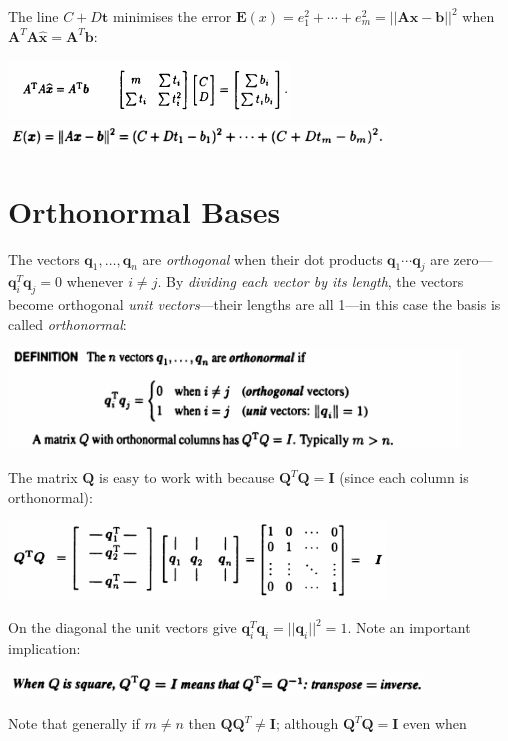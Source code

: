 \documentclass{report}
\begin{document}
The line $C+D\bm{t}$ minimises the error $\bm E(x)=e_1^2+\cdots+e_m^2=||\bm{Ax}-\bm b||^2$ when $\bm A^T\bm A\hat{\bm x}=\bm A^T\bm b$:
\begin{center}
\includegraphics[width=7.5cm]{78}
\includegraphics[width=10cm]{79}
\end{center}
\newpage

\section{Orthonormal Bases}
The vectors $\bm q_1,\ldots,\bm q_n$ are \textit{orthogonal} when their dot products $\bm q_1\cdots \bm q_j$ are zero---$\bm q_i^T\bm q_j=0$ whenever $i\neq j$. By \textit{
dividing each vector by its length}, the vectors become orthogonal \textit{unit vectors}---their lengths are all 1---in this case the basis is called \textit{orthonormal}:
\begin{center}
\includegraphics[width=12cm]{80}
\end{center}
The matrix $\bm Q$ is easy to work with because $\bm Q^T\bm Q=\bm I$ (since each column is orthonormal):
\begin{center}
\includegraphics[width=10cm]{81}
\end{center}
On the diagonal the unit vectors give $\bm q_i^T\bm q_i=||\bm q_i||^2=1$.
Note an important implication:
\begin{center}
\includegraphics[width=11cm]{82}
\end{center}
Note that generally if $m\neq n$ then $\bm{QQ}^T\neq\bm I$; although $\bm Q^T\bm Q=\bm I$ even when
\end{document}
